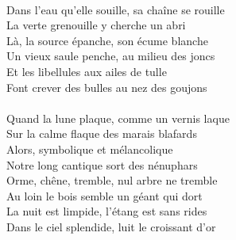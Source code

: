 \\Dans l'eau qu'elle souille, sa chaîne se rouille
\\La verte grenouille y cherche un abri
\\Là, la source épanche, son écume blanche
\\Un vieux saule penche, au milieu des joncs
\\Et les libellules aux ailes de tulle
\\Font crever des bulles au nez des goujons
\\\\Quand la lune plaque, comme un vernis laque
\\Sur la calme flaque des marais blafards
\\Alors, symbolique et mélancolique
\\Notre long cantique sort des nénuphars
\\Orme, chêne, tremble, nul arbre ne tremble
\\Au loin le bois semble un géant qui dort
\\La nuit est limpide, l'étang est sans rides
\\Dans le ciel splendide, luit le croissant d'or
\breakpage